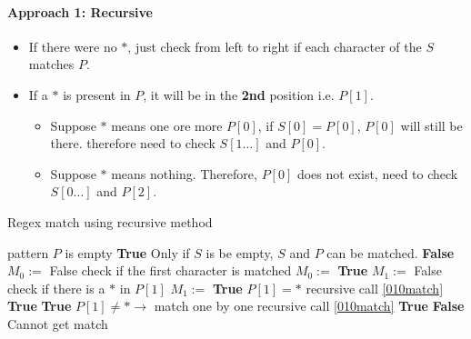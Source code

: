\documentclass[a4paper,12pt]{article}
\begin{document}
\paragraph{Approach 1: Recursive}
\begin{itemize}
\item If there were no {\color{red}$\ast$}, just check from left to right if each character of the $S$ matches $P$.
\item If a {\color{red}$\ast$} is present in $P$, it will be in the \textbf{\color{red}2nd} position i.e. $P[1]$. 
\begin{itemize}
\item Suppose $\ast$ means one ore more $P[0]$, if $S[0]=P[0]$, $P[0]$ will still be there. therefore need to check $S[1\ldots]$ and $P[0]$.
\item Suppose $\ast$ means nothing. Therefore, $P[0]$ does not exist, need to check $S[0\ldots]$ and $P[2]$.
\end{itemize}
\end{itemize}

\setcounter{algorithm}{0}
\begin{algorithm}[H]
\caption{Regex match using recursive method}
\begin{algorithmic}[1]
\Statex
{}
 \Comment pattern $P$ is empty
\State \Return \textbf{\color{red}True} \Comment Only if $S$ is be empty, $S$ and $P$ can be matched.
\Else
\State \Return \textbf{False}
\EndIf
\EndIf
\State $M_{0} :=$ False 
 \Comment check if the first character is matched
\State $M_{0} :=$ \textbf{\color{red}True}
\EndIf
\State $M_{1} :=$ False
 \Comment check if there is a $\ast$ in $P[1]$
\State $M_{1} :=$ \textbf{\color{red}True}
\EndIf
{} \Comment $P[1] = \ast$
 \Comment recursive call \ref{010match}
\State \Return \textbf{True} 
\State \Return \textbf{True} 
\EndIf
\Else \Comment $P[1] \neq \ast \rightarrow$ match one by one
 \Comment recursive call \ref{010match}
\State \Return \textbf{True}
\EndIf
\EndIf
\State \Return \textbf{False} \Comment Cannot get match
\EndProcedure
\Statex
\end{algorithmic}
\end{algorithm}
\end{document}
